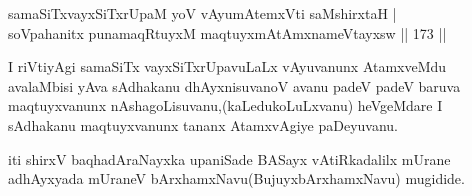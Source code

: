
\begin{shl}
samaSiTxvayxSiTxrUpaM yoV vAyumAtemxVti saMshirxtaH |\\
soV\s pahanitx punamaqRtuyxM maqtuyxmAtAmxnameVtayxsw \hfill || 173 ||
\end{shl}

\begin{artha}
I riVtiyAgi samaSiTx vayxSiTxrUpavuLaLx vAyuvanunx AtamxveMdu avalaMbisi yAva sAdhakanu dhAyxnisuvanoV avanu padeV padeV baruva maqtuyxvanunx nAshagoLisuvanu,(kaLedukoLuLxvanu) heVgeMdare I sAdhakanu maqtuyxvanunx tananx AtamxvAgiye paDeyuvanu.
\end{artha}

\begin{center}
iti shirxV baqhadAraNayxka upaniSade BASayx vAtiRkadalilx mUrane adhAyxyada mUraneV bArxhamxNavu(BujuyxbArxhamxNavu) mugidide.
\end{center}
